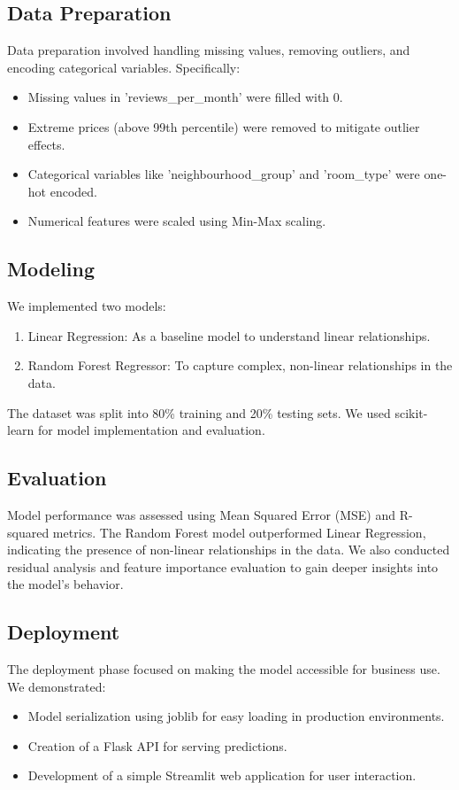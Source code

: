 \documentclass{article}
\begin{document}
\subsection{Data Preparation}
Data preparation involved handling missing values, removing outliers, and encoding categorical variables. Specifically:
\begin{itemize}
    \item Missing values in 'reviews\_per\_month' were filled with 0.
    \item Extreme prices (above 99th percentile) were removed to mitigate outlier effects.
    \item Categorical variables like 'neighbourhood\_group' and 'room\_type' were one-hot encoded.
    \item Numerical features were scaled using Min-Max scaling.
\end{itemize}

\subsection{Modeling}
We implemented two models:
\begin{enumerate}
    \item Linear Regression: As a baseline model to understand linear relationships.
    \item Random Forest Regressor: To capture complex, non-linear relationships in the data.
\end{enumerate}

The dataset was split into 80\% training and 20\% testing sets. We used scikit-learn for model implementation and evaluation.

\subsection{Evaluation}
Model performance was assessed using Mean Squared Error (MSE) and R-squared metrics. The Random Forest model outperformed Linear Regression, indicating the presence of non-linear relationships in the data. We also conducted residual analysis and feature importance evaluation to gain deeper insights into the model's behavior.

\subsection{Deployment}
The deployment phase focused on making the model accessible for business use. We demonstrated:
\begin{itemize}
    \item Model serialization using joblib for easy loading in production environments.
    \item Creation of a Flask API for serving predictions.
    \item Development of a simple Streamlit web application for user interaction.
\end{itemize}
\end{document}
